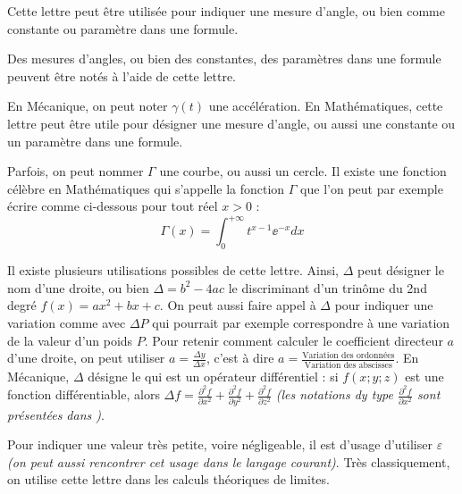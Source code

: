 
\cadre{$\alpha$} Cette lettre peut être utilisée pour indiquer une mesure d'angle, ou bien comme constante ou paramètre dans une formule.


\cadre{$\beta$} Des mesures d'angles, ou bien des constantes, des paramètres dans une formule peuvent être notés à l'aide de cette lettre.


\cadre{$\gamma$} En Mécanique, on peut noter $\gamma(t)$ une accélération. En Mathématiques, cette lettre peut être utile pour désigner une mesure d'angle, ou aussi une constante ou un paramètre dans une formule.


\cadre{$\Gamma$} Parfois, on peut nommer $\Gamma$ une courbe, ou aussi un cercle. Il existe une fonction célèbre en Mathématiques qui s'appelle la fonction $\Gamma$ que l'on peut par exemple écrire comme ci-dessous pour tout réel $x > 0$ :
\begin{equation}
	\Gamma(x) = \int_{0}^{+\infty} t^{x-1} \ee^{-x} dx
\end{equation}


\cadre{$\Delta$} Il existe plusieurs utilisations possibles de cette lettre. Ainsi, $\Delta$ peut désigner le nom d'une droite, ou bien $\Delta = b^ 2 - 4 a c$ le discriminant d’un trinôme du 2nd degré $f(x) = a x^2 + b x + c$. On peut aussi faire appel à $\Delta$ pour indiquer une variation comme avec $\Delta P$ qui pourrait par exemple correspondre à une variation de la valeur d'un poids $P$.
Pour retenir comment calculer le coefficient directeur $a$ d'une droite, on peut utiliser $a = \frac{\Delta y}{\Delta x}$, c'est à dire $a = \frac{ \text{Variation des ordonnées} }{ \text{Variation des abscisses} }$.
En Mécanique, $\Delta$ désigne le  qui est un opérateur différentiel : si $f(x;y;z)$ est une fonction différentiable, alors $\Delta f =\frac{\partial^{2} f}{\partial x^{2}} + \frac{\partial^{2} f}{\partial y^{2}} + \frac{\partial^{2} f}{\partial z^{2}}$ \emph{(les notations dy type $\frac{\partial^{2} f}{\partial x^{2}}$ sont présentées dans  \pageref{partialDer})}.


\cadre{$\varepsilon$} Pour indiquer une valeur très petite, voire négligeable, il est d'usage d'utiliser $\varepsilon$ \emph{(on peut aussi rencontrer cet usage dans le langage courant)}. Très classiquement, on utilise cette lettre dans les calculs théoriques de limites.


